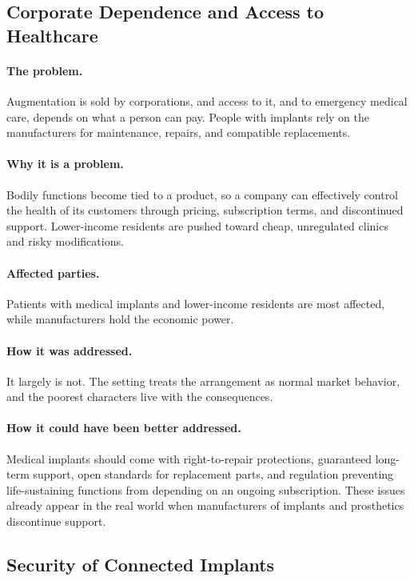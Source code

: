 \documentclass{article}%
\begin{document}
\subsection{Corporate Dependence and Access to Healthcare}

\paragraph{The problem.}
Augmentation is sold by corporations, and access to it, and to emergency medical care, depends on what a person can pay. People with implants rely on the manufacturers for maintenance, repairs, and compatible replacements.

\paragraph{Why it is a problem.}
Bodily functions become tied to a product, so a company can effectively control the health of its customers through pricing, subscription terms, and discontinued support. Lower-income residents are pushed toward cheap, unregulated clinics and risky modifications.

\paragraph{Affected parties.}
Patients with medical implants and lower-income residents are most affected, while manufacturers hold the economic power.

\paragraph{How it was addressed.}
It largely is not. The setting treats the arrangement as normal market behavior, and the poorest characters live with the consequences.

\paragraph{How it could have been better addressed.}
Medical implants should come with right-to-repair protections, guaranteed long-term support, open standards for replacement parts, and regulation preventing life-sustaining functions from depending on an ongoing subscription. These issues already appear in the real world when manufacturers of implants and prosthetics discontinue support.

\subsection{Security of Connected Implants}
\end{document}
